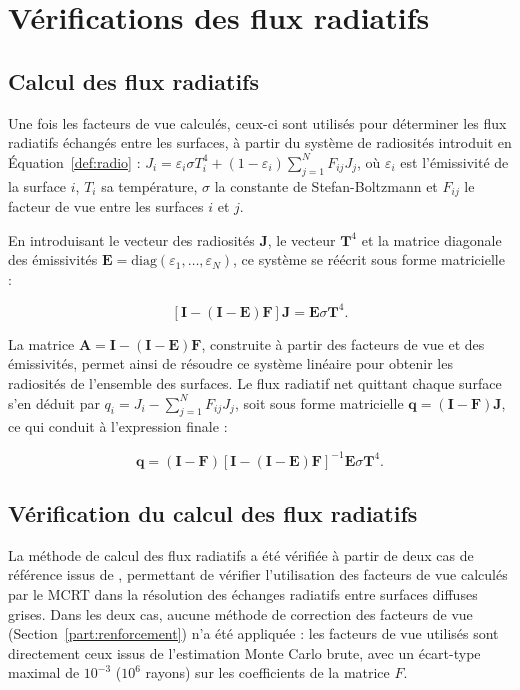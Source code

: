 \section{Vérifications des flux radiatifs}

\subsection{Calcul des flux radiatifs}

Une fois les facteurs de vue calculés, ceux-ci sont utilisés pour déterminer les flux radiatifs échangés entre les surfaces, à partir du système de radiosités introduit en Équation~\ref{def:radio} :
$J_i = \varepsilon_i \sigma T_i^4 + (1-\varepsilon_i)\sum_{j=1}^{N} F_{ij}J_j$,
où $\varepsilon_i$ est l'émissivité de la surface $i$, $T_i$ sa température, $\sigma$ la constante de Stefan-Boltzmann et $F_{ij}$ le facteur de vue entre les surfaces $i$ et $j$.

En introduisant le vecteur des radiosités $\mathbf{J}$, le vecteur $\mathbf{T}^4$ et la matrice diagonale des émissivités $\mathbf{E}=\mathrm{diag}(\varepsilon_1,\ldots,\varepsilon_N)$, ce système se réécrit sous forme matricielle :

\begin{equation}
\left[\mathbf{I} - (\mathbf{I}-\mathbf{E})\mathbf{F}\right]\mathbf{J} = \mathbf{E}\sigma\mathbf{T}^4.
\label{eq:systeme_radiosite}
\end{equation}

La matrice $\mathbf{A} = \mathbf{I} - (\mathbf{I}-\mathbf{E})\mathbf{F}$, construite à partir des facteurs de vue et des émissivités, permet ainsi de résoudre ce système linéaire pour obtenir les radiosités de l'ensemble des surfaces. Le flux radiatif net quittant chaque surface s'en déduit par $q_i = J_i - \sum_{j=1}^{N} F_{ij}J_j$, soit sous forme matricielle $\mathbf{q} = (\mathbf{I}-\mathbf{F})\mathbf{J}$, ce qui conduit à l'expression finale :

\begin{equation}
\mathbf{q} = (\mathbf{I}-\mathbf{F})\left[\mathbf{I} - (\mathbf{I}-\mathbf{E})\mathbf{F}\right]^{-1} \mathbf{E}\sigma\mathbf{T}^4.
\label{eq:q_final}
\end{equation}
\subsection{Vérification du calcul des flux radiatifs}

La méthode de calcul des flux radiatifs a été vérifiée à partir de deux cas de référence issus de \cite{howell}, permettant de vérifier l'utilisation des facteurs de vue calculés par le MCRT dans la résolution des échanges radiatifs entre surfaces diffuses grises. Dans les deux cas, aucune méthode de correction des facteurs de vue (Section~\ref{part:renforcement}) n'a été appliquée : les facteurs de vue utilisés sont directement ceux issus de l'estimation Monte Carlo brute, avec un écart-type maximal de $10^{-3}$ ($10^6$ rayons) sur les coefficients de la matrice $F$.

